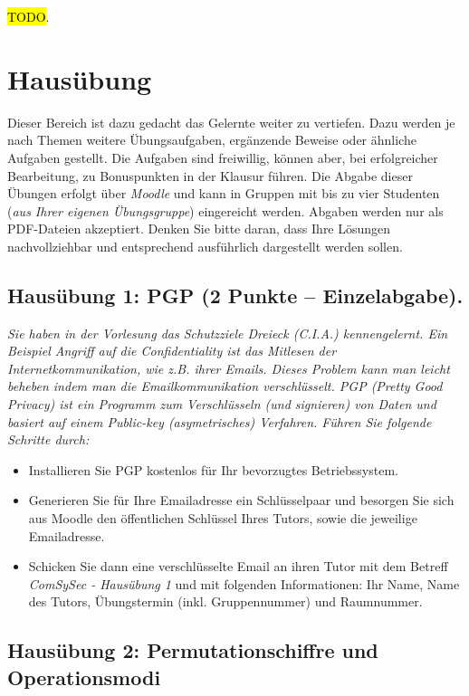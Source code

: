 \documentclass[
  ngerman,
  DIV=12
]{scrartcl}
\begin{document}
\medskip\noindent
\hl{TODO}.

\section{Hausübung}

Dieser Bereich ist dazu gedacht das Gelernte weiter zu vertiefen. Dazu werden je nach Themen weitere Übungsaufgaben, ergänzende Beweise oder ähnliche Aufgaben gestellt. Die Aufgaben sind freiwillig, können aber, bei erfolgreicher Bearbeitung, zu Bonuspunkten in der Klausur führen. Die Abgabe dieser Übungen erfolgt über \emph{Moodle} und kann in Gruppen mit bis zu vier Studenten (\emph{aus Ihrer eigenen Übungsgruppe}) eingereicht werden. Abgaben werden nur als PDF-Dateien akzeptiert. Denken Sie bitte daran, dass Ihre Lösungen nachvollziehbar und entsprechend ausführlich dargestellt werden sollen.

\subsection*{Hausübung 1: PGP (2 Punkte -- Einzelabgabe).}

\itshape Sie haben in der Vorlesung das Schutzziele Dreieck (C.I.A.) kennengelernt. Ein Beispiel Angriff auf die Confidentiality ist das Mitlesen der Internetkommunikation, wie z.B. ihrer Emails. Dieses Problem kann man leicht beheben indem man die Emailkommunikation verschlüsselt. PGP (Pretty Good Privacy) ist ein Programm zum Verschlüsseln (und signieren) von Daten und basiert auf einem Public-key (asymetrisches) Verfahren. Führen Sie folgende Schritte durch:
\begin{itemize}
\item Installieren Sie PGP kostenlos für Ihr bevorzugtes Betriebssystem.
\item Generieren Sie für Ihre Emailadresse ein Schlüsselpaar und besorgen Sie sich aus Moodle den öffentlichen Schlüssel Ihres Tutors, sowie die jeweilige Emailadresse.
\item Schicken Sie dann eine verschlüsselte Email an ihren Tutor mit dem Betreff \emph{ComSySec - Hausübung 1} und mit folgenden Informationen: Ihr Name, Name des Tutors, Übungstermin (inkl. Gruppennummer) und Raumnummer.  
\end{itemize}\upshape

\subsection*{Hausübung 2: Permutationschiffre und Operationsmodi}
\end{document}
